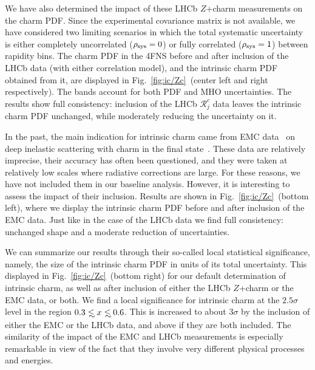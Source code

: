 \documentclass[11pt,a4paper]{article}
\def\lsim{\mathrel{\rlap{\lower4pt\hbox{\hskip1pt$\sim$}}
    \raise1pt\hbox{$<$}}}         %
\begin{document}
 We have also determined the impact of these LHCb $Z$+charm measurements on the
charm PDF.
%
Since the experimental covariance matrix is not available,
we have considered two limiting scenarios in which the total
systematic uncertainty is either completely uncorrelated 
($\rho_{\rm sys}=0$) or fully correlated  ($\rho_{\rm sys}=1$) between
 rapidity bins. The charm PDF in the 4FNS before and after
inclusion of the LHCb data (with either correlation model), and the intrinsic
charm PDF obtained from it, are displayed in
Fig.~\ref{fig:ic/Zc}~(center left and right respectively).
%
The bands account for both PDF and MHO uncertainties.
%
The results show full consistency: inclusion of the LHCb  $\mathcal{R}_j^c$ data leaves
the intrinsic charm PDF unchanged, while moderately reducing the
uncertainty on it.

In the past, the main indication for  intrinsic charm came from EMC data~\cite{Aubert:1982tt} on deep inelastic scattering with charm in the final state~\cite{Harris:1995jx}.
%
These data are relatively imprecise, their accuracy has often been questioned,
and they were taken at relatively low scales where radiative corrections are large.
%
For these reasons, we have not included them in our baseline
analysis.
%
However, it is interesting to assess the impact of
their inclusion.
%
Results are shown in 
Fig.~\ref{fig:ic/Zc}~(bottom left), where we display the
intrinsic charm PDF before and after inclusion of the EMC data.
%
Just
like in the case of the LHCb data we find full consistency: unchanged
shape and a moderate reduction of uncertainties.

We can summarize our results  through their so-called local statistical
significance, namely, the size of the intrinsic charm PDF
in units of its total uncertainty.
%
This displayed  in Fig.~\ref{fig:ic/Zc}~(bottom right) for our default determination of
intrinsic charm, as well as after inclusion of either the LHCb $Z$+charm or the
EMC data, or both.
%
We find a local significance for intrinsic charm at the $2.5\sigma$ level
in the region $0.3 \lsim x \lsim 0.6$.
%
This is increased to about
$3\sigma$ by the inclusion of either the EMC or the LHCb
data, and above if they are both included.
%
The similarity of the impact of the EMC and LHCb measurements is
especially remarkable in view of the fact that they involve very
different physical processes and energies.
\end{document}
